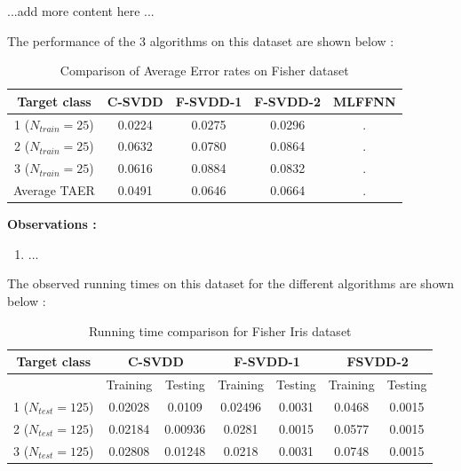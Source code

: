 \documentclass{article} %
\begin{document}
...add more content here ...

The performance of the 3 algorithms on this dataset are shown below :


\begin{table}[H]
\begin{center}
\caption{Comparison of Average Error rates on Fisher dataset}
\begin{tabular}{|c|c|c|c|c|}
\hline
Target class & C-SVDD & F-SVDD-1 & F-SVDD-2 & MLFFNN \\ \hline
1 ($N_{train} = 25$) &  0.0224  & 0.0275  & 0.0296  &. \\ \hline
2 ($N_{train} = 25$) &  0.0632  &  0.0780  & 0.0864  &. \\ \hline
3 ($N_{train} = 25$) & 0.0616  &  0.0884  & 0.0832 &. \\ \hline
Average TAER &  0.0491 & 0.0646 &  0.0664 &. \\ \hline

\end{tabular}
\end{center}
\end{table}


\textbf{Observations :}
\begin{enumerate}
\item ...
\end{enumerate}




The observed running times on this dataset for the different algorithms are shown below :

\begin{table}[H]
\begin{center}
\caption{Running time comparison for Fisher Iris dataset}
\begin{tabular}{|c|c|c|c|c|c|c|}
\hline
Target class & \multicolumn{2}{|c|}{C-SVDD} & \multicolumn{2}{|c|}{F-SVDD-1} & \multicolumn{2}{|c|}{FSVDD-2}  \\ \hline
& Training & Testing & Training & Testing & Training & Testing \\ \hline
1 ($N_{test} =125$)  & 0.02028 & 0.0109 & 0.02496  & 0.0031 & 0.0468 & 0.0015 \\ \hline
2 ($N_{test} =125$) & 0.02184 & 0.00936 & 0.0281  &  0.0015 & 0.0577 & 0.0015 \\ \hline
3 ($N_{test} =125$) &  0.02808 &  0.01248 & 0.0218  & 0.0031 & 0.0748 & 0.0015 \\ \hline

\end{tabular} \\[5pt]
\end{center}
\end{table}
\end{document}

